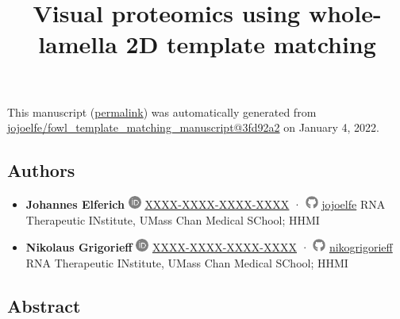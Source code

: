 \documentclass[
]{article}
\title{Visual proteomics using whole-lamella 2D template matching}
\author{}
\date{}
\begin{document}
\maketitle

This manuscript
(\href{https://jojoelfe.github.io/fowl_template_matching_manuscript/v/3fd92a26614a26949905aec5a87c6e0dabaffd3a/}{permalink})
was automatically generated
from \href{https://github.com/jojoelfe/fowl_template_matching_manuscript/tree/3fd92a26614a26949905aec5a87c6e0dabaffd3a}{jojoelfe/fowl\_template\_matching\_manuscript@3fd92a2}
on January 4, 2022.

\hypertarget{authors}{%
\subsection{Authors}\label{authors}}

\begin{itemize}
\item
  \textbf{Johannes Elferich}
  \includegraphics[width=0.16667in,height=0.16667in]{images/orcid.pdf}
  \href{https://orcid.org/XXXX-XXXX-XXXX-XXXX}{XXXX-XXXX-XXXX-XXXX}
  · \includegraphics[width=0.16667in,height=0.16667in]{images/github.pdf}
  \href{https://github.com/jojoelfe}{jojoelfe}
  RNA Therapeutic INstitute, UMass Chan Medical SChool; HHMI
\item
  \textbf{Nikolaus Grigorieff}
  \includegraphics[width=0.16667in,height=0.16667in]{images/orcid.pdf}
  \href{https://orcid.org/XXXX-XXXX-XXXX-XXXX}{XXXX-XXXX-XXXX-XXXX}
  · \includegraphics[width=0.16667in,height=0.16667in]{images/github.pdf}
  \href{https://github.com/nikogrigorieff}{nikogrigorieff}
  RNA Therapeutic INstitute, UMass Chan Medical SChool; HHMI
\end{itemize}

\hypertarget{abstract}{%
\subsection{Abstract}\label{abstract}}
\end{document}
